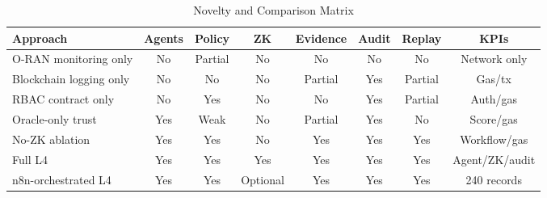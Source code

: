 \begin{table}[!t]
\centering
\caption{Novelty and Comparison Matrix}
\label{tab:novelty}
\begin{adjustbox}{width=\textwidth}
\begin{tabular}{lccccccc}
\toprule
Approach & Agents & Policy & ZK & Evidence & Audit & Replay & KPIs \\
\midrule
O-RAN monitoring only & No & Partial & No & No & No & No & Network only \\
Blockchain logging only & No & No & No & Partial & Yes & Partial & Gas/tx \\
RBAC contract only & No & Yes & No & No & Yes & Partial & Auth/gas \\
Oracle-only trust & Yes & Weak & No & Partial & Yes & No & Score/gas \\
No-ZK ablation & Yes & Yes & No & Yes & Yes & Yes & Workflow/gas \\
Full L4 & Yes & Yes & Yes & Yes & Yes & Yes & Agent/ZK/audit \\
n8n-orchestrated L4 & Yes & Yes & Optional & Yes & Yes & Yes & 240 records \\
\bottomrule
\end{tabular}
\end{adjustbox}
\end{table}
